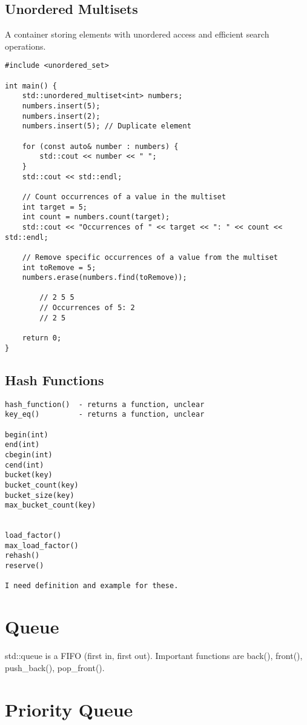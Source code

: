 \documentclass[openany]{report}
\begin{document}
\subsection{Unordered Multisets}

A container storing elements with unordered access and efficient search operations.

\begin{verbatim}
#include <unordered_set>

int main() {
    std::unordered_multiset<int> numbers;
    numbers.insert(5);
    numbers.insert(2);
    numbers.insert(5); // Duplicate element

    for (const auto& number : numbers) {
        std::cout << number << " ";
    }
    std::cout << std::endl;

    // Count occurrences of a value in the multiset
    int target = 5;
    int count = numbers.count(target);
    std::cout << "Occurrences of " << target << ": " << count << std::endl;

    // Remove specific occurrences of a value from the multiset
    int toRemove = 5;
    numbers.erase(numbers.find(toRemove));
    
        // 2 5 5
        // Occurrences of 5: 2
        // 2 5

    return 0;
}
\end{verbatim}

\subsection{Hash Functions}

\begin{verbatim}
hash_function()  - returns a function, unclear
key_eq()         - returns a function, unclear 

begin(int)
end(int)
cbegin(int)
cend(int)
bucket(key)
bucket_count(key)
bucket_size(key)
max_bucket_count(key)


load_factor()
max_load_factor()
rehash()
reserve()

I need definition and example for these.
\end{verbatim}

\section{Queue}
std::queue is a FIFO (first in, first out). Important functions are back(), front(), push\_back(), pop\_front().

\section{Priority Queue}
\end{document}
